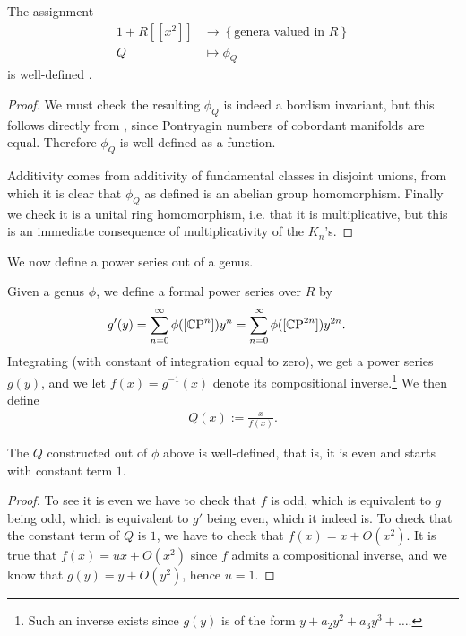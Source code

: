 \documentclass[11pt]{book}
\begin{document}
\begin{proposition}\label{prop:phiQ-well-defined} The assignment
\begin{equation}\label{eqn:Q-to-phiQ}
\begin{aligned}
    1+R[[x^2]] &\to\left\{ \text{genera valued in }R \right\}  \\
    Q &\mapsto \phi_Q
\end{aligned}
\end{equation}
is well-defined \cite[p.~14]{MMF}.
\end{proposition}
\begin{proof} We must check the resulting $\phi_Q$ is indeed a bordism invariant, but this follows directly from , since Pontryagin numbers of cobordant manifolds are equal. Therefore $\phi_Q$ is well-defined as a function.

Additivity comes from additivity of fundamental classes in disjoint unions, from which it is clear that $\phi_Q$ as defined is an abelian group homomorphism. Finally we check it is a unital ring homomorphism, i.e. that it is multiplicative, but this is an immediate consequence of multiplicativity of the $K_n$'s.
\end{proof}

We now define a power series out of a genus.

\begin{construction}\label{constr:power-series-from-genus}
Given a genus $\phi$, we define a formal power series over $R$ by
\begin{align*}
    g'(y) &= \sum_{n=0}^\infty \phi([{\mathbb{C}\text{P}}^n]) y^n = \sum_{n=0}^\infty \phi([{\mathbb{C}\text{P}}^{2n}]) y^{2n}.
\end{align*}
Integrating (with constant of integration equal to zero), we get a power series $g(y)$, and we let $f(x) = g^{-1}(x)$ denote its compositional inverse.\footnote{Such an inverse exists since $g(y)$ is of the form $y + a_2 y^2 + a_3 y^3 +\ldots $.} We then define
\begin{align*}
    Q(x) := \frac{x}{f(x)}.
\end{align*}
\end{construction}

\begin{proposition} The $Q$ constructed out of $\phi$ above is well-defined, that is, it is even and starts with constant term $1$.
\end{proposition}
\begin{proof} To see it is even we have to check that $f$ is odd, which is equivalent to $g$ being odd, which is equivalent to $g'$ being even, which it indeed is. To check that the constant term of $Q$ is $1$, we have to check that $f(x) = x + O(x^2) $. It is true that $f(x) = ux + O(x^2)$ since $f$ admits a compositional inverse, and we know that $g(y) = y + O(y^2)$, hence $u=1$.
\end{proof}
\end{document}
